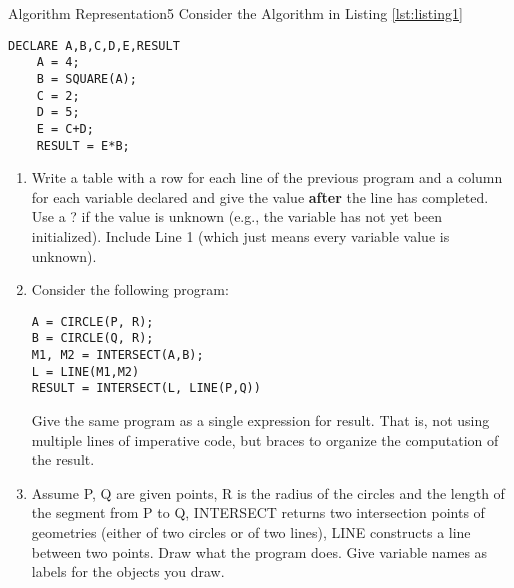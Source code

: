 \documentclass[a4paper,twoside]{article}
\begin{document}
\begin{task}{Algorithm Representation}{5}{}
  Consider the Algorithm in Listing \ref{lst:listing1}
  \begin{lstlisting}[caption=An imperative program, label=lst:listing1]
    DECLARE A,B,C,D,E,RESULT
    A = 4;
    B = SQUARE(A);
    C = 2;
    D = 5;
    E = C+D;
    RESULT = E*B;
\end{lstlisting}

  \begin{enumerate}
  \item {Write a table with a row for each line of the previous program and a column for each variable declared and give the value \textbf{after} the line has completed. Use a ? if the value is unknown (e.g., the variable has not yet been initialized). Include Line 1 (which just means every variable value is unknown).
    \vspace*{8cm}}
    \clearpage
    
  \item{Consider the following program:
\begin{lstlisting}
A = CIRCLE(P, R);
B = CIRCLE(Q, R);
M1, M2 = INTERSECT(A,B);
L = LINE(M1,M2)
RESULT = INTERSECT(L, LINE(P,Q))
\end{lstlisting}


    Give the same program as a single expression for result. That is, not using multiple lines of imperative code, but braces to organize the computation of the result.
    \vspace*{4cm}}

  \item{Assume P, Q are given points, R is the radius of the circles and the length of the segment from P to Q, INTERSECT returns two intersection points of geometries (either of two circles or of two lines), LINE constructs a line between two points. Draw what the program does. Give variable names as labels for the objects you draw.\vspace*{2cm}}

    
  \end{enumerate}
  
  
\end{task}
%
%  
%
\end{document}
